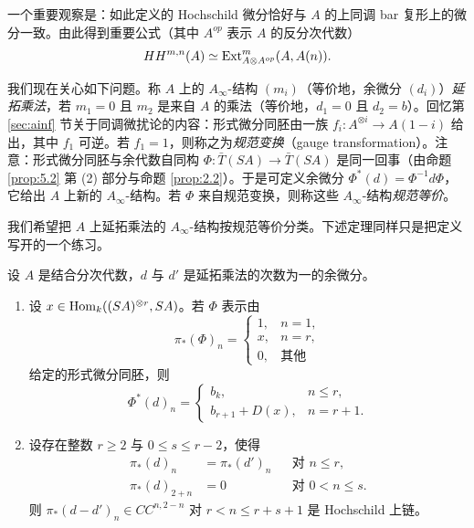 一个重要观察是：如此定义的 Hochschild 微分恰好与 $A$ 的上同调 bar 复形上的微分一致。由此得到重要公式（其中 $A^{op}$ 表示 $A$ 的反分次代数）
\[
HH^{m,n}(A)\simeq\operatorname{Ext}^m_{A\otimes A^{op}}(A,A(n)).
\]


我们现在关心如下问题。称 $A$ 上的 $A_\infty$-结构 $(m_i)$（等价地，余微分 $(d_i)$）\emph{延拓乘法}，若 $m_1=0$ 且 $m_2$ 是来自 $A$ 的乘法（等价地，$d_1=0$ 且 $d_2=b$）。回忆第 \ref{sec:ainf} 节关于同调微扰论的内容：形式微分同胚由一族 $f_i:A^{\otimes i}\to A(1-i)$ 给出，其中 $f_1$ 可逆。若 $f_1=1$，则称之为\emph{规范变换}（gauge transformation）。注意：形式微分同胚与余代数自同构 $\Phi:\bar T(SA)\to\bar T(SA)$ 是同一回事（由命题 \ref{prop:5.2} 第 (2) 部分与命题 \ref{prop:2.2}）。于是可定义余微分 $\Phi^*(d)=\Phi^{-1}d\Phi$，它给出 $A$ 上新的 $A_\infty$-结构。若 $\Phi$ 来自规范变换，则称这些 $A_\infty$-结构\emph{规范等价}。

我们希望把 $A$ 上延拓乘法的 $A_\infty$-结构按规范等价分类。下述定理同样只是把定义写开的一个练习。

\begin{theorem}\label{thm:5.3}
设 $A$ 是结合分次代数，$d$ 与 $d'$ 是延拓乘法的次数为一的余微分。
\begin{enumerate}
  \item 设 $x\in\operatorname{Hom}_k((SA)^{\otimes r},SA)$。若 $\Phi$ 表示由
  \[
  \pi_*(\Phi)_n=\begin{cases}1, & n=1,\\ x, & n=r,\\ 0, & \text{其他}\end{cases}
  \]
  给定的形式微分同胚，则
  \[
  \Phi^*(d)_n=\begin{cases}b_k, & n\le r,\\ b_{r+1}+D(x), & n=r+1.\end{cases}
  \]
  \item 设存在整数 $r\ge2$ 与 $0\le s\le r-2$，使得
  \[
  \begin{aligned}
  \pi_*(d)_n&=\pi_*(d')_n &&\text{对 } n\le r,\\
  \pi_*(d)_{2+n}&=0 &&\text{对 } 0<n\le s.
  \end{aligned}
  \]
  则 $\pi_*(d-d')_n\in CC^{n,2-n}$ 对 $r<n\le r+s+1$ 是 Hochschild 上链。
\end{enumerate}
\end{theorem}

